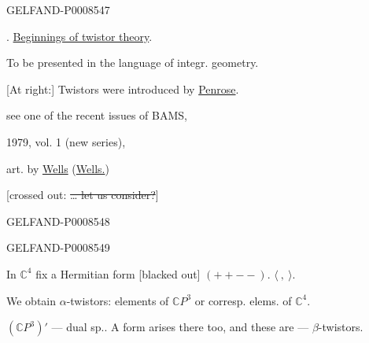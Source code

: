 \begin{GelfandAdjacentEvidence}{GELFAND-P000854}{7}


\medskip
{}. \uline{Beginnings of twistor theory}.

To be presented in the language of integr. geometry.

[At right:] Twistors were introduced by \uline{Penrose}.

see one of the recent issues of BAMS,

1979, vol. 1 (new series),

art. by \uline{Wells} (\uline{Wells.})

[crossed out: \sout{… let us consider?}]
\end{GelfandAdjacentEvidence}
\begin{GelfandAdjacentEvidence}{GELFAND-P000854}{8}


\end{GelfandAdjacentEvidence}
\begin{GelfandAdjacentEvidence}{GELFAND-P000854}{9}


In \(\mathbb{C}^4\) fix a Hermitian form [blacked out] \((++--)\). \(\langle\ ,\ \rangle\).
\end{GelfandAdjacentEvidence}


We obtain \(\alpha\)-twistors: elements of \(\mathbb{C}P^3\) or corresp. elems. of \(\mathbb{C}^4\).

\((\mathbb{C}P^3)'\) — dual sp.. A form arises there too, and these are — \(\beta\)-twistors.


